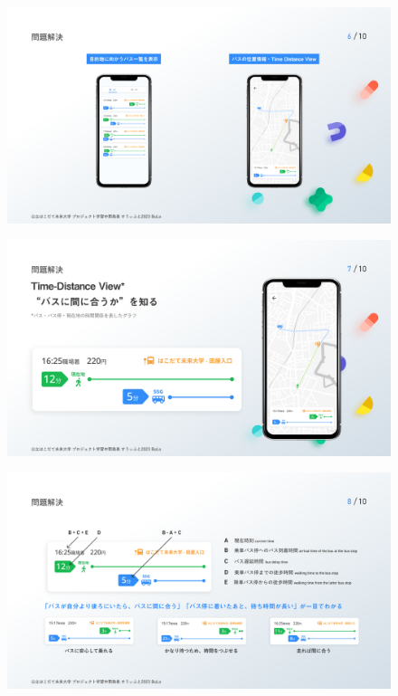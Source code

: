 \begin{figure}[H]
    \includegraphics[width=14cm]{images/slide6.png}
    \label{fig:slide6}
\end{figure}
\begin{figure}[H]
    \includegraphics[width=14cm]{images/slide7.png}
    \label{fig:slide7}
\end{figure}
\begin{figure}[H]
    \includegraphics[width=14cm]{images/slide8.png}
    \label{fig:slide8}
\end{figure}
